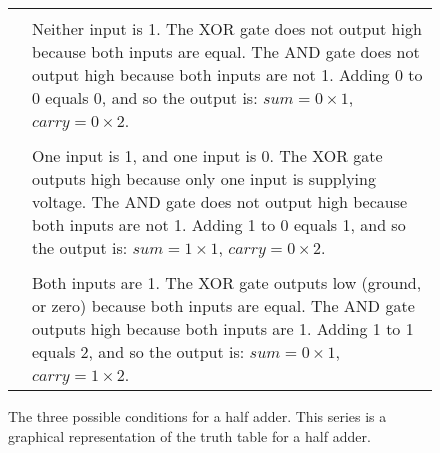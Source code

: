 \begin{figure}[ht!]
\begin{center}

\begin{tabular}{m{3.2in} m{2.5in}}
\hline\\[\negsep]
 & 
Neither input is 1. The XOR gate does not output high because both inputs are equal. The AND gate does not output high because both inputs are not 1. Adding 0 to 0 equals 0, and so the output is: $sum = 0 \times 1$, $carry = 0 \times 2$.\\[\sep]
\hline\\[\negsep]

 &  
One input is 1, and one input is 0. The XOR gate outputs high because only one input is supplying voltage. The AND gate does not output high because both inputs are not 1. Adding 1 to 0 equals 1, and so the output is: $sum  = 1 \times 1$, $carry = 0 \times 2$.\\[\sep]
\hline\\[\negsep]

 &  
Both inputs are 1. The XOR gate outputs low (ground, or zero) because both inputs are equal. The AND gate outputs high because both inputs are 1. Adding 1 to 1 equals 2, and so the output is: $sum  = 0 \times 1$, $carry = 1 \times 2$.\\[\sep]
\hline
\end{tabular}

\caption{The three possible conditions for a half adder. This series is a graphical representation of the truth table for a half adder.}
\label{fig:threehalfadders}
\end{center}
\end{figure}
